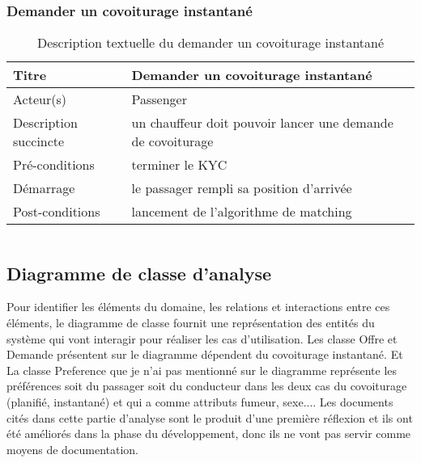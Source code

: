 \subsubsection{Demander un covoiturage instantané} %
\begin{table}[H]
\begin{center}
    \begin{tabular}{ | l | p{10cm} | }
    \hline
    Titre & Demander un covoiturage instantané \\ \hline
    Acteur(s) & Passenger \\ \hline
    Description succincte & un chauffeur doit pouvoir lancer une demande de covoiturage \\ \hline
    Pré-conditions & terminer le KYC \\ \hline
    Démarrage & le passager rempli sa position d'arrivée \\ \hline
    Post-conditions & lancement de l'algorithme de matching \\ \hline
    \end{tabular}
    \caption{Description textuelle du demander un covoiturage instantané}
\end{center}
\end{table}

\begin{tabular}{c}

\end{tabular}
\subsection{Diagramme de classe d'analyse} %
Pour identifier les éléments du domaine, les relations et interactions entre ces éléments, le diagramme de classe fournit une représentation des entités du système qui vont interagir pour réaliser les cas d'utilisation.
\newline
Les classe Offre et Demande présentent sur le diagramme dépendent du covoiturage instantané. Et La classe Preference que je n'ai pas mentionné sur le diagramme représente les préférences soit du passager soit du conducteur dans les deux cas du covoiturage (planifié, instantané) et qui a comme attributs fumeur, sexe....\newline
Les documents cités dans cette partie d'analyse sont le produit d'une première réflexion et ils ont été améliorés dans la phase du développement, donc ils ne vont pas servir comme moyens de documentation.
